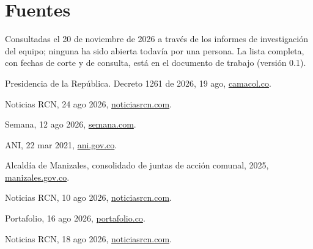 \documentclass[11pt,letterpaper,parskip=half-]{scrartcl}
\begin{document}
\section*{Fuentes}
{\footnotesize\ancizarlining
Consultadas el 20 de noviembre de 2026 a través de los informes de investigación del equipo; ninguna ha sido abierta todavía por una persona. La lista completa, con fechas de corte y de consulta, está en el documento de trabajo (versión 0.1).
\begin{multicols}{2}
\begin{enumerate}[label={[\arabic*]}, ref={\arabic*}, leftmargin=2.2em, itemsep=0pt]
\item\label{f:decreto} Presidencia de la República. Decreto 1261 de 2026, 19 ago, \href{https://camacol.co/sites/default/files/descargables/DECRETO%201261de%202026_EMERGENCIA_compressed.pdf}{camacol.co}.
\item\label{f:censo} Noticias RCN, 24 ago 2026, \href{https://www.noticiasrcn.com/colombia/manizales-prepara-la-demolicion-de-7-edificios-que-presentan-danos-estructurales-1053593}{noticiasrcn.com}.
\item\label{f:vias} Semana, 12 ago 2026, \href{https://www.semana.com/nacion/articulo/actualizacion-de-las-vias-que-siguen-cerradas-tras-el-terremoto-en-colombia/202602/}{semana.com}.
\item\label{f:ani} ANI, 22 mar 2021, \href{https://www.ani.gov.co/w/se-mantiene-el-cierre-total-de-la-v%C3%ADa-manizales-chinchin%C3%A1-debido-a-las-fuertes-lluvias}{ani.gov.co}.
\item\label{f:jac} Alcaldía de Manizales, consolidado de juntas de acción comunal, 2025, \href{https://manizales.gov.co/wp-content/uploads/2025/08/CONSOLIDADO-JUNTAS-ACCION-COMUNAL-Y-ADMINISTRADORAS-LOCALES-JAC-JAL.pdf}{manizales.gov.co}.
\item\label{f:corredor} Noticias RCN, 10 ago 2026, \href{https://www.noticiasrcn.com/colombia/bancos-de-alimentos-activan-corredor-humanitario-tras-sismo-de-7-4-en-colombia-1048906}{noticiasrcn.com}.
\item\label{f:flypass} Portafolio, 16 ago 2026, \href{https://www.portafolio.co/economia/regiones/flypass-paga-peajes-de-57-camiones-para-acelerar-la-entrega-de-ayudas-tras-el-terremoto-en-colombia-500521}{portafolio.co}.
\item\label{f:retos} Noticias RCN, 18 ago 2026, \href{https://www.noticiasrcn.com/colombia/abaco-supera-las-2-000-toneladas-de-ayuda-humanitaria-recolectadas-para-damnificados-por-el-terremoto-1051306}{noticiasrcn.com}.

\end{enumerate}
\end{multicols}}
\end{document}
